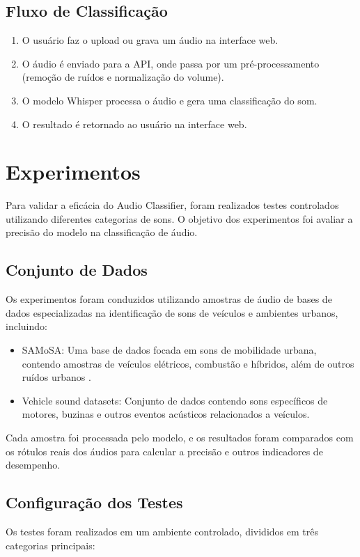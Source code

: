 \documentclass[conference]{IEEEtran}
\begin{document}
\subsection{Fluxo de Classificação}
\begin{enumerate}
\item O usuário faz o upload ou grava um áudio na interface web.
\item O áudio é enviado para a API, onde passa por um pré-processamento (remoção de ruídos e normalização do volume).
\item O modelo Whisper processa o áudio e gera uma classificação do som.
\item O resultado é retornado ao usuário na interface web.
\end{enumerate}

\section{Experimentos}
Para validar a eficácia do Audio Classifier, foram realizados testes controlados utilizando diferentes categorias de sons. O objetivo dos experimentos foi avaliar a precisão do modelo na classificação de áudio.

\subsection{Conjunto de Dados}
Os experimentos foram conduzidos utilizando amostras de áudio de bases de dados especializadas na identificação de sons de veículos e ambientes urbanos, incluindo:

\begin{itemize}
\item SAMoSA: Uma base de dados focada em sons de mobilidade urbana, contendo amostras de veículos elétricos, combustão e híbridos, além de outros ruídos urbanos \cite{b4}.
\item Vehicle sound datasets: Conjunto de dados contendo sons específicos de motores, buzinas e outros eventos acústicos relacionados a veículos.
\end{itemize}

Cada amostra foi processada pelo modelo, e os resultados foram comparados com os rótulos reais dos áudios para calcular a precisão e outros indicadores de desempenho.

\subsection{Configuração dos Testes}
Os testes foram realizados em um ambiente controlado, divididos em três categorias principais:
\end{document}
